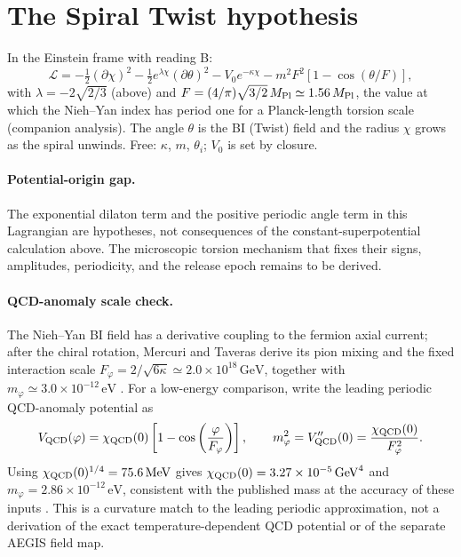 \documentclass[11pt]{article}
\newcommand{\Mp}{M_{\rm Pl}}
\begin{document}
\section{The Spiral Twist hypothesis}
In the Einstein frame with reading B:
\begin{equation}
\mathcal L=-\tfrac12(\partial\chi)^2-\tfrac12e^{\lambda\chi}(\partial\theta)^2-V_0e^{-\kappa\chi}
-m^2F^2\left[1-\cos(\theta/F)\right],
\end{equation}
with $\lambda=-2\sqrt{2/3}$ (above) and $F=(4/\pi)\sqrt{3/2}\,\Mp\simeq1.56\,\Mp$, the value at which the
Nieh--Yan index has period one for a Planck-length torsion scale (companion analysis). The angle $\theta$ is the BI
(Twist) field and the radius $\chi$ grows as the spiral unwinds. Free: $\kappa$, $m$, $\theta_i$; $V_0$ is set by
closure.

\paragraph{Potential-origin gap.} The exponential dilaton term and the positive periodic angle term in this
Lagrangian are hypotheses, not consequences of the constant-superpotential calculation above. The microscopic
torsion mechanism that fixes their signs, amplitudes, periodicity, and the release epoch remains to be derived.

\paragraph{QCD-anomaly scale check.}
The Nieh--Yan BI field has a derivative coupling to the fermion axial current; after the chiral rotation, Mercuri and
Taveras derive its pion mixing and the fixed interaction scale
$F_\varphi=2/\sqrt{6\kappa}\simeq2.0\times10^{18}\,\mathrm{GeV}$, together with
$m_\varphi\simeq3.0\times10^{-12}\,\mathrm{eV}$ \cite{mercuri2009}. For a low-energy comparison, write the leading
periodic QCD-anomaly potential as
\begin{equation}
V_{\rm QCD}(\varphi)=\chi_{\rm QCD}(0)\left[1-\cos\left(\frac{\varphi}{F_\varphi}\right)\right],
\qquad
m_\varphi^2=V_{\rm QCD}''(0)=\frac{\chi_{\rm QCD}(0)}{F_\varphi^2}.
\end{equation}
Using $\chi_{\rm QCD}(0)^{1/4}=75.6\,\mathrm{MeV}$ gives
$\chi_{\rm QCD}(0)=3.27\times10^{-5}\,\mathrm{GeV}^4$ and
$m_\varphi=2.86\times10^{-12}\,\mathrm{eV}$, consistent with the published mass at the accuracy of these inputs
\cite{lu2020}. This is a curvature match to the leading periodic approximation, not a derivation of the exact
temperature-dependent QCD potential or of the separate AEGIS field map.
\end{document}
